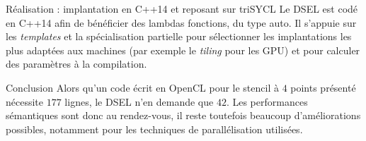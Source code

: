 \documentclass[a4paper,10pt]{article}
\begin{document}
\begin{center}
\begin{bclogo}[couleur=black!10,couleurBord=black!50,arrondi=0.1,logo=\hspace{17pt},barre=none]{Réalisation : implantation en C++14 et reposant sur triSYCL}
Le DSEL est codé en \textsf{C++14} afin de bénéficier des \textsf{lambdas fonctions}, du type \textsf{auto}. Il s'appuie sur les \emph{templates} et la spécialisation partielle pour sélectionner les implantations les plus adaptées aux machines (par exemple le \emph{tiling} pour les GPU) et pour calculer des paramètres à la compilation.

\end{bclogo}

\vspace{0.15cm}

\begin{bclogo}[couleur=black!10,couleurBord=black!50,arrondi=0.1,logo=\hspace{17pt},barre=none]{Conclusion}
Alors qu'un code écrit en \textsf{OpenCL} pour le stencil à $4$ points présenté nécessite $177$ lignes, le DSEL n'en demande que $42$. Les performances sémantiques sont donc au rendez-vous, il reste toutefois beaucoup d'améliorations possibles, notamment pour les techniques de parallélisation utilisées.

\end{bclogo}

\end{center}
\end{document}
